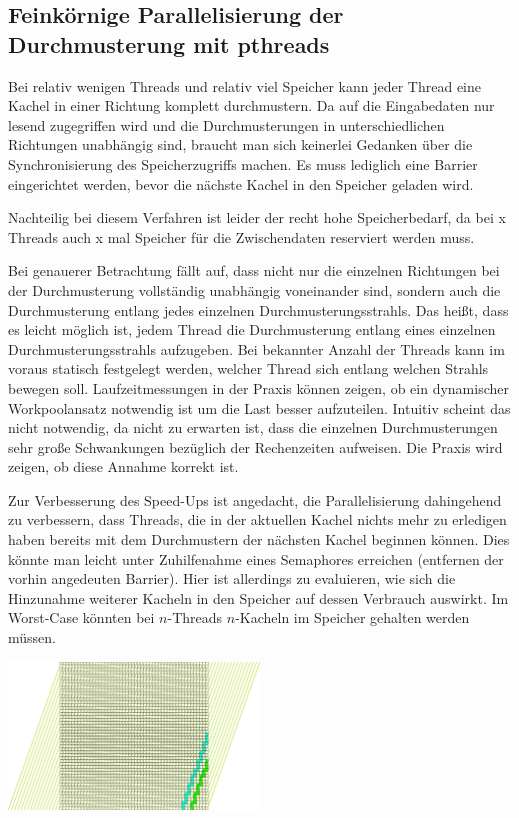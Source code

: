 \documentclass[
11pt, %
a4paper, %
oneside, %
pdfspacing, %
headinclude,
BCOR5mm, %
ngerman, %
bibtotocnumbered,
]{scrartcl}
\begin{document}
\subsection{Feinkörnige Parallelisierung der Durchmusterung mit pthreads}

Bei relativ wenigen Threads und relativ viel Speicher kann jeder Thread eine Kachel in einer Richtung komplett durchmustern. Da auf die Eingabedaten nur lesend zugegriffen wird und die Durchmusterungen in unterschiedlichen Richtungen unabhängig sind, braucht man sich keinerlei Gedanken über die Synchronisierung des Speicherzugriffs machen. Es muss lediglich eine Barrier eingerichtet werden, bevor die nächste Kachel in den Speicher geladen wird.

Nachteilig bei diesem Verfahren ist leider der recht hohe Speicherbedarf, da bei x Threads auch x mal Speicher für die Zwischendaten reserviert werden muss.

\skippingparagraph

Bei genauerer Betrachtung fällt auf, dass nicht nur die einzelnen Richtungen bei der Durchmusterung vollständig unabhängig voneinander sind, sondern auch die Durchmusterung entlang jedes einzelnen Durchmusterungsstrahls. Das heißt, dass es leicht möglich ist, jedem Thread die Durchmusterung entlang eines einzelnen Durchmusterungsstrahls aufzugeben. Bei bekannter Anzahl der Threads kann im voraus statisch festgelegt werden, welcher Thread sich entlang welchen Strahls bewegen soll. Laufzeitmessungen in der Praxis können zeigen, ob ein dynamischer Workpoolansatz notwendig ist um die Last besser aufzuteilen. Intuitiv scheint das nicht notwendig, da nicht zu erwarten ist, dass die einzelnen Durchmusterungen sehr große Schwankungen bezüglich der Rechenzeiten aufweisen. Die Praxis wird zeigen, ob diese Annahme korrekt ist.

Zur Verbesserung des Speed-Ups ist angedacht, die Parallelisierung dahingehend zu verbessern, dass Threads, die in der aktuellen Kachel nichts mehr zu erledigen haben bereits mit dem Durchmustern der nächsten Kachel beginnen können. Dies könnte man leicht unter Zuhilfenahme eines Semaphores erreichen (entfernen der vorhin angedeuten Barrier). Hier ist allerdings zu evaluieren, wie sich die Hinzunahme weiterer Kacheln in den Speicher auf dessen Verbrauch auswirkt. Im Worst-Case könnten bei $n$-Threads $n$-Kacheln im Speicher gehalten werden müssen.


	\includegraphics[width=0.5\textwidth]{./drawings/Durchmusterungspfade_schraeg.png}
\end{document}
